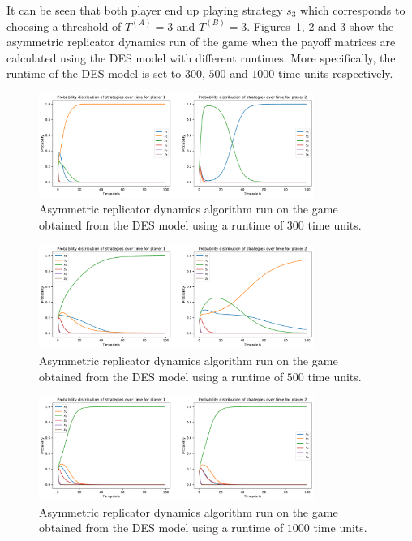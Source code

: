 It can be seen that both player end up playing strategy \(s_3\) which
corresponds to choosing a threshold of \(T^{(A)} = 3\) and \(T^{(B)} = 3\).
Figures~\ref{fig:game_des_runtime_300}, \ref{fig:game_des_runtime_500} and
\ref{fig:game_des_runtime_1000} show the asymmetric replicator dynamics run of
the game when the payoff matrices are calculated using the DES model with
different runtimes.
More specifically, the runtime of the DES model is set to \(300\), \(500\) and
\(1000\) time units respectively.

\begin{figure}[H]
    \centering
    \includegraphics[width=0.8\textwidth]{chapters/06_agent_based_extension/Bin/game_model_with_des/game_simulation_300.pdf}
    \caption{Asymmetric replicator dynamics algorithm run on the game obtained
    from the DES model using a runtime of \(300\) time units.}
    \label{fig:game_des_runtime_300}
\end{figure}

\begin{figure}[H]
    \centering
    \includegraphics[width=0.8\textwidth]{chapters/06_agent_based_extension/Bin/game_model_with_des/game_simulation_500.pdf}
    \caption{Asymmetric replicator dynamics algorithm run on the game obtained
    from the DES model using a runtime of \(500\) time units.}
    \label{fig:game_des_runtime_500}
\end{figure}

\begin{figure}[H]
    \centering
    \includegraphics[width=0.8\textwidth]{chapters/06_agent_based_extension/Bin/game_model_with_des/game_simulation_1000.pdf}
    \caption{Asymmetric replicator dynamics algorithm run on the game obtained
    from the DES model using a runtime of \(1000\) time units.}
    \label{fig:game_des_runtime_1000}
\end{figure}

